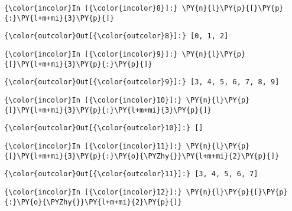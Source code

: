     \begin{Verbatim}[commandchars=\\\{\}]
{\color{incolor}In [{\color{incolor}8}]:} \PY{n}{l}\PY{p}{[}\PY{p}{:}\PY{l+m+mi}{3}\PY{p}{]}
\end{Verbatim}

            \begin{Verbatim}[commandchars=\\\{\}]
{\color{outcolor}Out[{\color{outcolor}8}]:} [0, 1, 2]
\end{Verbatim}
        
    \begin{Verbatim}[commandchars=\\\{\}]
{\color{incolor}In [{\color{incolor}9}]:} \PY{n}{l}\PY{p}{[}\PY{l+m+mi}{3}\PY{p}{:}\PY{p}{]}
\end{Verbatim}

            \begin{Verbatim}[commandchars=\\\{\}]
{\color{outcolor}Out[{\color{outcolor}9}]:} [3, 4, 5, 6, 7, 8, 9]
\end{Verbatim}
        
    \begin{Verbatim}[commandchars=\\\{\}]
{\color{incolor}In [{\color{incolor}10}]:} \PY{n}{l}\PY{p}{[}\PY{l+m+mi}{3}\PY{p}{:}\PY{l+m+mi}{3}\PY{p}{]}
\end{Verbatim}

            \begin{Verbatim}[commandchars=\\\{\}]
{\color{outcolor}Out[{\color{outcolor}10}]:} []
\end{Verbatim}
        
    \begin{Verbatim}[commandchars=\\\{\}]
{\color{incolor}In [{\color{incolor}11}]:} \PY{n}{l}\PY{p}{[}\PY{l+m+mi}{3}\PY{p}{:}\PY{o}{\PYZhy{}}\PY{l+m+mi}{2}\PY{p}{]}
\end{Verbatim}

            \begin{Verbatim}[commandchars=\\\{\}]
{\color{outcolor}Out[{\color{outcolor}11}]:} [3, 4, 5, 6, 7]
\end{Verbatim}
        
    \begin{Verbatim}[commandchars=\\\{\}]
{\color{incolor}In [{\color{incolor}12}]:} \PY{n}{l}\PY{p}{[}\PY{p}{:}\PY{o}{\PYZhy{}}\PY{l+m+mi}{2}\PY{p}{]}
\end{Verbatim}

